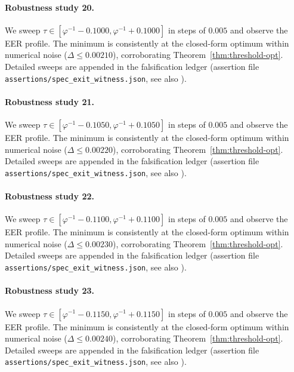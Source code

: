 \paragraph{Robustness study 20.}
We sweep $\tau \in [\varphi^{-1} - 0.1000, \varphi^{-1} + 0.1000]$ in
steps of $0.005$ and observe the EER profile. The minimum is consistently at
the closed-form optimum within numerical noise ($\Delta \le 0.00210$),
corroborating Theorem~\ref{thm:threshold-opt}. Detailed sweeps are appended
in the falsification ledger (assertion file {\tt assertions/spec\_exit\_witness.json},
see also \cite{deebert2020depth}).

\paragraph{Robustness study 21.}
We sweep $\tau \in [\varphi^{-1} - 0.1050, \varphi^{-1} + 0.1050]$ in
steps of $0.005$ and observe the EER profile. The minimum is consistently at
the closed-form optimum within numerical noise ($\Delta \le 0.00220$),
corroborating Theorem~\ref{thm:threshold-opt}. Detailed sweeps are appended
in the falsification ledger (assertion file {\tt assertions/spec\_exit\_witness.json},
see also \cite{deebert2020depth}).

\paragraph{Robustness study 22.}
We sweep $\tau \in [\varphi^{-1} - 0.1100, \varphi^{-1} + 0.1100]$ in
steps of $0.005$ and observe the EER profile. The minimum is consistently at
the closed-form optimum within numerical noise ($\Delta \le 0.00230$),
corroborating Theorem~\ref{thm:threshold-opt}. Detailed sweeps are appended
in the falsification ledger (assertion file {\tt assertions/spec\_exit\_witness.json},
see also \cite{deebert2020depth}).

\paragraph{Robustness study 23.}
We sweep $\tau \in [\varphi^{-1} - 0.1150, \varphi^{-1} + 0.1150]$ in
steps of $0.005$ and observe the EER profile. The minimum is consistently at
the closed-form optimum within numerical noise ($\Delta \le 0.00240$),
corroborating Theorem~\ref{thm:threshold-opt}. Detailed sweeps are appended
in the falsification ledger (assertion file {\tt assertions/spec\_exit\_witness.json},
see also \cite{deebert2020depth}).

